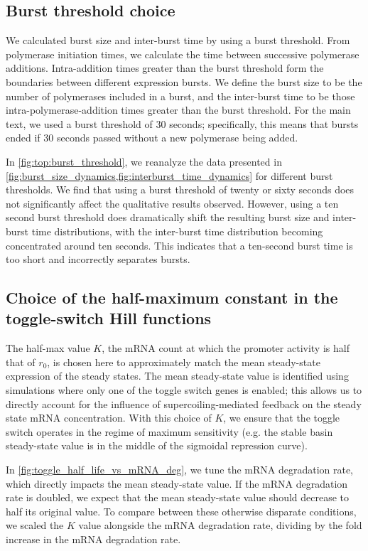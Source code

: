 \documentclass[11pt]{article}
\begin{document}
\subsection{Burst threshold choice} \label{sec:supp:burst_threshold}
We calculated burst size and inter-burst time by using a burst threshold. From polymerase initiation times, we calculate the time between successive polymerase additions. Intra-addition times greater than the burst threshold form the boundaries between different expression bursts. We define the burst size to be the number of polymerases included in a burst, and the inter-burst time to be those intra-polymerase-addition times greater than the burst threshold. For the main text, we used a burst threshold of 30 seconds; specifically, this means that bursts ended if 30 seconds passed without a new polymerase being added.

In \cref{fig:top:burst_threshold}, we reanalyze the data presented in \cref{fig:burst_size_dynamics,fig:interburst_time_dynamics} for different burst thresholds. We find that using a burst threshold of twenty or sixty seconds does not significantly affect the qualitative results observed. However, using a ten second burst threshold does dramatically shift the resulting burst size and inter-burst time distributions, with the inter-burst time distribution becoming concentrated around ten seconds. This indicates that a ten-second burst time is too short and incorrectly separates bursts.

\subsection{Choice of the half-maximum constant in the toggle-switch Hill functions} \label{sec:supp:choice_of_k}
The half-max value \(K\), the mRNA count at which the promoter activity is half that of \(r_0\), is chosen here to approximately match the mean steady-state expression of the steady states. The mean steady-state value is identified using simulations where only one of the toggle switch genes is enabled; this allows us to directly account for the influence of supercoiling-mediated feedback on the steady state mRNA concentration. With this choice of \(K\), we ensure that the toggle switch operates in the regime of maximum sensitivity (e.g. the stable basin steady-state value is in the middle of the sigmoidal repression curve).

 In \cref{fig:toggle_half_life_vs_mRNA_deg}, we tune the mRNA degradation rate, which directly impacts the mean steady-state value. If the mRNA degradation rate is doubled, we expect that the mean steady-state value should decrease to half its original value. To compare between these otherwise disparate conditions, we scaled the \(K\) value alongside the mRNA degradation rate, dividing by the fold increase in the mRNA degradation rate.
\end{document}
